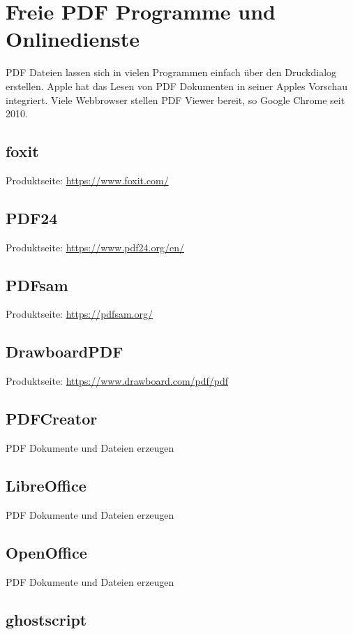 \section{Freie PDF Programme und Onlinedienste}
PDF Dateien lassen sich in vielen Programmen einfach über den Druckdialog erstellen. Apple hat das Lesen von PDF Dokumenten in seiner Apples Vorschau integriert. Viele Webbrowser stellen PDF Viewer bereit, so Google Chrome seit 2010. \cite{wiki-pdf-de}

\subsection{foxit}
Produktseite: \url{https://www.foxit.com/}

\subsection{PDF24}
Produktseite: \url{https://www.pdf24.org/en/}

\subsection{PDFsam}
Produktseite: \url{https://pdfsam.org/}

\subsection{DrawboardPDF}
Produktseite: \url{https://www.drawboard.com/pdf/pdf}

\subsection{PDFCreator}
PDF Dokumente und Dateien erzeugen

\subsection{LibreOffice}
PDF Dokumente und Dateien erzeugen

\subsection{OpenOffice}
PDF Dokumente und Dateien erzeugen

\subsection{ghostscript}

